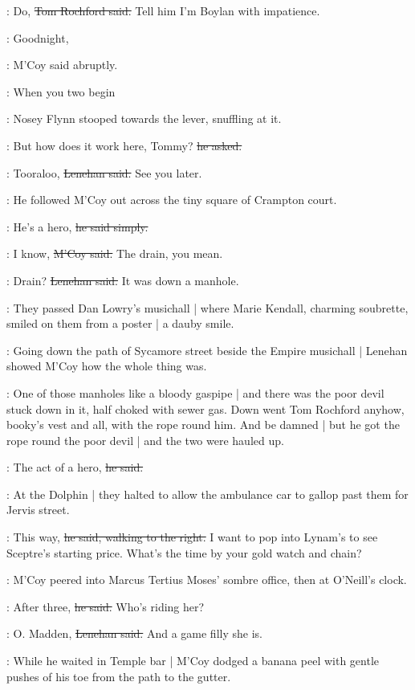 \rochford:
Do,
\sout{Tom Rochford said.}
Tell him I'm Boylan with impatience.

\mcoy:
Goodnight,

:
M'Coy said abruptly.

\mcoy:
When you two begin

:
Nosey Flynn stooped towards the lever,
snuffling at it.

\nosey:
But how does it work here, Tommy?
\sout{he asked.}

\lenehan:
Tooraloo,
\sout{Lenehan said.}
See you later.

:
He followed M'Coy out
across the tiny square of Crampton court.

\lenehan:
He's a hero,
\sout{he said simply.}

\mcoy:
I know,
\sout{M'Coy said.}
The drain, you mean.

\lenehan:
Drain?
\sout{Lenehan said.}
It was down a manhole.

:
They passed Dan Lowry's musichall |
where Marie Kendall,
charming soubrette,
smiled on them from a poster |
a dauby smile.

:
Going down the path of Sycamore street
beside the Empire musichall |
Lenehan showed M'Coy how the whole thing was.

\lenehan:
One of those manholes like a bloody gaspipe |
and there was the poor devil stuck down in it,
half choked with sewer gas.
Down went Tom Rochford anyhow,
booky's vest and all,
with the rope round him.
And be damned |
but he got the rope round the poor devil |
and the two were hauled up.

\lenehan:
The act of a hero,
\sout{he said.}

:
At the Dolphin |
they halted to allow the ambulance car
to gallop past them for Jervis street.

\lenehan:
This way,
\sout{he said,
walking to the right.}
I want to pop into Lynam's
to see Sceptre's starting price.
What's the time by your gold watch and chain?

:
M'Coy peered into Marcus Tertius Moses' sombre office,
then at O'Neill's clock.

\mcoy:
After three,
\sout{he said.}
Who's riding her?

\lenehan:
O. Madden,
\sout{Lenehan said.}
And a game filly she is.

:
While he waited in Temple bar |
M'Coy dodged a banana peel
with gentle pushes of his toe
from the path
to the gutter.

